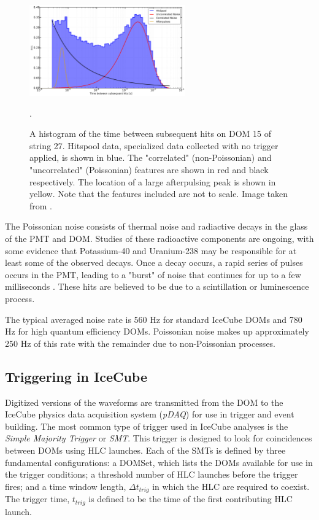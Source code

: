 \begin{figure}
\centering
\includegraphics[width=0.6\textwidth]{vuvuzela.png} 
\caption[The timing structure of noise in the IceCube detector]{A histogram of the time between subsequent hits on DOM 15 of string 27. Hitspool data, specialized data collected with no trigger applied, is shown in blue. The "correlated" (non-Poissonian) and "uncorrelated" (Poissonian) features are shown in red and black respectively. The location of a large afterpulsing peak is shown in yellow. Note that the features included are not to scale. Image taken from \cite{Description-IceCube}.}
\label{fig:noise_model}.
\end{figure}

The Poissonian noise consists of thermal noise and radiactive decays in the glass of the PMT and DOM.
Studies of these radioactive components are ongoing, with some evidence that Potassium-40 and Uranium-238 may be responsible for at least some of the observed decays.
Once a decay occurs, a rapid series of pulses occurs in the PMT, leading to a "burst" of noise that continues for up to a few milliseconds \cite{Thesis-Vuvuzela}. 
These hits are believed to be due to a scintillation or luminescence process.

The typical averaged noise rate is 560 Hz for standard IceCube DOMs and 780 Hz for high quantum efficiency DOMs.
Poissonian noise makes up approximately 250 Hz of this rate with the remainder due to non-Poissonian processes.

\subsection{Triggering in IceCube}
\label{subsec:triggers}
Digitized versions of the waveforms are transmitted from the DOM to the IceCube physics data acquisition system (\emph{pDAQ}) for use in trigger and event building.
The most common type of trigger used in IceCube analyses is the \emph{Simple Majority Trigger} or \emph{SMT}. 
This trigger is designed to look for coincidences between DOMs using HLC launches.
Each of the SMTs is defined by three fundamental configurations: a DOMSet, which lists the DOMs available for use in the trigger conditions; a threshold number of HLC launches before the trigger fires; and a time window length, $\Delta t_{trig}$ in which the HLC are required to coexist.
The trigger time, $t_{trig}$ is defined to be the time of the first contributing HLC launch.

